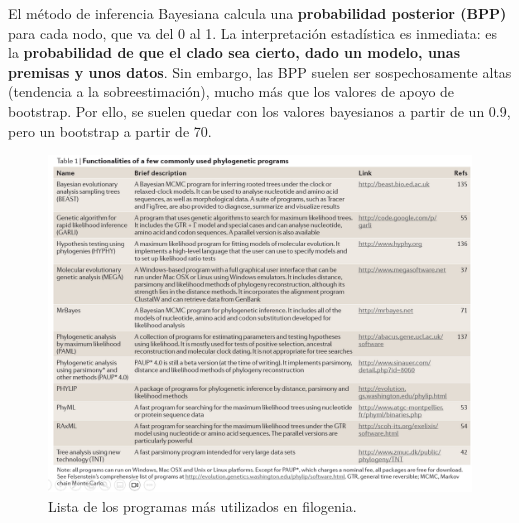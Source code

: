 El método de inferencia Bayesiana calcula una \textbf{probabilidad posterior (BPP)} para cada nodo, que va del 0 al 1. La interpretación estadística es inmediata: es la \textbf{probabilidad de que el clado sea cierto, dado un modelo, unas premisas y unos datos}. Sin embargo, las BPP suelen ser sospechosamente altas (tendencia a la sobreestimación), mucho más que los valores de apoyo de bootstrap. Por ello, se suelen quedar con los valores bayesianos a partir de un 0.9, pero un bootstrap a partir de 70.

\begin{figure}[htbp]
\centering
\includegraphics[width=\linewidth]{figs/programas-filogenia.png}
\caption{Lista de los programas más utilizados en filogenia.}
\end{figure}